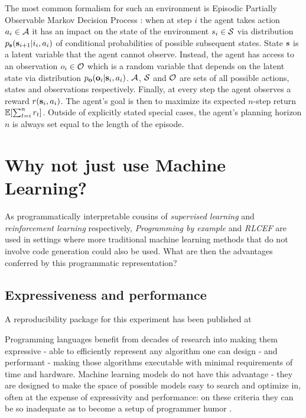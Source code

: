 The most common formalism for such an environment is Episodic Partially Observable Markov Decision Process \cite{kramerjdavidrPartiallyObservableMarkov1964,spaanPartiallyObservableMarkov2012}: when at step $i$ the agent takes action $a_i \in \mathcal{A}$ it has an impact on  the state of the environment $s_i \in \mathcal{S}$ via distribution $p_{\textbf{s}}(\textbf{s}_{i+1} | i_i, a_i)$ of conditional probabilities of possible subsequent states. 
State $\textbf{s}$ is a latent variable that the agent cannot observe.
Instead, the agent has access to an observation $o_i \in \mathcal{O}$ which is a random variable that depends on the latent state via distribution $p_{\mathbf{o}}(\mathbf{o}_i | \textbf{s}_i, a_i)$.
$\mathcal{A}$, $\mathcal{S}$ and $\mathcal{O}$ are sets of all possible actions, states and observations respectively.
Finally, at every step the agent observes a reward $r(\textbf{s}_i,a_i)$.
The agent's goal is then to maximize its expected $n$-step return $\mathbb{E} [ \sum_{t=i}^{n} r_t ]$. Outside of explicitly stated special cases, the agent's planning horizon $n$ is always set equal to the length of the episode.

\newpage
\section{Why not just use Machine Learning?}
\label{sec:whynotml}

As programmatically interpretable cousins of \emph{supervised learning} and \emph{reinforcement learning} respectively, \emph{Programming by example} and \emph{RLCEF} are  used in settings where more traditional machine learning methods that do not involve code generation could also be used.
What are then the advantages conferred by this programmatic representation?

\subsection{Expressiveness and performance}
\begin{remark}
    A reproducibility package for this experiment has been published at \cite{liventsevVadim0x60FizzbuzzlmSearching}
\end{remark}

Programming languages benefit from decades of research into making them \textcolor{accent}{expressive} - able to efficiently represent any algorithm one can design - and \textcolor{accent}{performant} - making those algorithms executable with minimal requirements of time and hardware.
Machine learning models do not have this advantage - they are designed to make the space of possible models easy to search and optimize in, often at the expense of expressivity and performance: on these criteria they can be so inadequate as to become a setup of programmer humor \cite{grusFizzBuzzTensorflow}.

